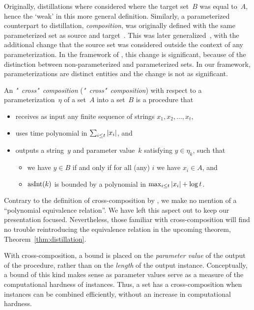 Originally, distillations where considered where the target set~$B$ was equal to~$A$, hence the \enquote*{weak} in this more general definition.
Similarly, a parameterized counterpart to distillation, \emph{composition}, was originally defined with the same parameterized set as source and target~\parencite{bodlaender2009problems}.
This was later generalized~\parencite{bodlaender2014kernelization}, with the additional change that the source set was considered outside the context of any parameterization.
In the framework of \citeauthor{downey1999parameterized}, this change is significant, because of the distinction between non-parameterized and parameterized sets.
In our framework, parameterizations are distinct entities and the change is not as significant.
\begin{definition}
  An \emph{"~cross"~composition} (\emph{"~cross"~composition}) with respect to a parameterization~$\eta$ of a set~$A$ into a set~$B$ is a procedure that
  \begin{itemize}
  \item receives as input any finite sequence of strings $x_1, x_2, \ldots, x_t$,
  \item uses time polynomial in $\sum_{i \le t} {\lvert x_i\rvert}$, and
  \item outputs a string~$y$ and parameter value~$k$ satisfying $y \in \eta_k$, such that
    \begin{itemize}
    \item we have $y \in B$ if and only if for all (any) $i$ we have $x_i \in A$, and
    \item $\operatorname{asInt}(k)$ is bounded by a polynomial in $\max_{i \le t} {\lvert x_i\rvert} + \log t$.
    \end{itemize}
  \end{itemize}
\end{definition}

Contrary to the definition of cross-composition by \textcite{bodlaender2014kernelization}, we make no mention of a \enquote{polynomial equivalence relation}.
We have left this aspect out to keep our presentation focused.
Nevertheless, those familiar with cross-composition will find no trouble reintroducing the equivalence relation in the upcoming theorem, Theorem~\ref{thm:distillation}.

With cross-composition, a bound is placed on the \emph{parameter value} of the output of the procedure, rather than on the \emph{length} of the output instance.
Conceptually, a bound of this kind makes sense as parameter values serve as a measure of the computational hardness of instances.
Thus, a set has a cross-composition when instances can be combined efficiently, without an increase in computational hardness.

